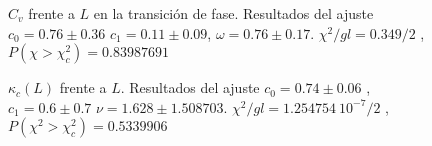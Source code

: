 \begin{figure}[h]
  \centering
  
  \caption{$C_v$ frente a $L$ en la transición de fase. Resultados del ajuste
    $c_0=0.76\pm 0.36$ $c_1=0.11\pm 0.09$,  $\omega=0.76\pm
    0.17$. $\chi^2/gl=0.349/2$ , $P(\chi>\chi_c^2)=0.83987691$}







\end{figure}

\begin{figure}[h]
  \centering
  
  \caption{$\kappa_c(L)$ frente a $L$. Resultados del ajuste $c_0=0.74\pm
    0.06$ ,$c_1=0.6\pm 0.7 $ $\nu=1.628 \pm 1.508703$. $\chi^2/gl=1.254754 \
    10^{-7}/2$ , $P(\chi^2>\chi_c^2)=0.5339906$ }







\end{figure}
\clearpage

